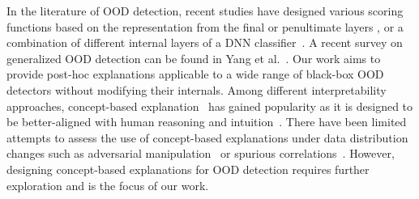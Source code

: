   In the literature of OOD detection, recent studies have designed various scoring functions based on the representation from the final or penultimate layers \citep{liang2018ODIN, devries2018learning}, or a combination of different internal layers of a DNN classifier~\citep{lee2018mahalanobis, lin2021MOOD, raghuram2021JTLA}.
A recent survey on generalized OOD detection can be found in Yang et al.~\citep{yang2021survey}. Our work aims to provide post-hoc explanations applicable to a wide range of black-box OOD detectors without modifying their internals.
Among different interpretability approaches, concept-based explanation~\citep{koh2020concept-bottleneck, SENN} has gained popularity as it is designed to be better-aligned with human reasoning \citep{armstrong1983human-concepts,tenenbaum1999concept-learning} and intuition~\citep{ghorbani2019ace,zhou2018interpretable,bouchacourt2019educe,yeh2020completeness}. There have been limited attempts to assess the use of concept-based explanations under data distribution changes such as adversarial manipulation~\citep{kim2018tcav} or spurious correlations~\citep{adebayo2020debugging}.
However, designing concept-based explanations for OOD detection requires further exploration and is the focus of our work.



\iffalse

